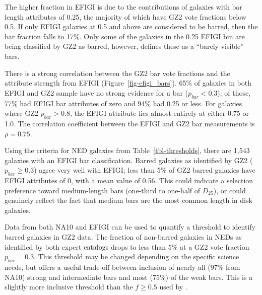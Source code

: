 \documentclass[useAMS,usenatbib]{mn2e}
\providecommand{\DIFaddtex}[1]{{\protect\color{blue}\uwave{#1}}} %
\providecommand{\DIFdeltex}[1]{{\protect\color{red}\sout{#1}}}                      %
\providecommand{\DIFaddbegin}{} %
\providecommand{\DIFaddend}{} %
\providecommand{\DIFdelbegin}{} %
\providecommand{\DIFdelend}{} %
\providecommand{\DIFadd}[1]{\texorpdfstring{\DIFaddtex{#1}}{#1}} %
\providecommand{\DIFdel}[1]{\texorpdfstring{\DIFdeltex{#1}}{}} %
\begin{document}
The higher fraction in EFIGI is due to the contributions of galaxies with bar length attributes of 0.25, the majority of which have GZ2 vote fractions below 0.5. If only EFIGI galaxies at 0.5 and above are considered to be barred, then the bar fraction falls to 17\%. Only some of the galaxies in the 0.25 EFIGI bin are being classified by GZ2 as barred, however, \citet{bai11} defines these as a ``barely visible'' bars. %

There is a strong correlation between the GZ2 bar vote fractions and the attribute strength from EFIGI (Figure~\ref{fig-efigi_bars}). 65\% of galaxies in both EFIGI and GZ2 sample have no strong evidence for a bar ($p_{bar}<0.3$); of those, 77\% had EFIGI bar attributes of zero and 94\% had 0.25 or less. For galaxies where GZ2 $p_{bar}>0.8$, the EFIGI attribute lies almost entirely at either 0.75 or 1.0. The correlation coefficient between the EFIGI and GZ2 bar measurements is $\rho=0.75$. 

Using the criteria for NED galaxies from Table~\ref{tbl-thresholds}, there are 1,543 galaxies with an EFIGI bar classification. Barred galaxies as identified by GZ2 ($p_{bar}\geq0.3$) agree very well with EFIGI; less than 5\% of GZ2 barred galaxies have EFIGI attributes of 0, with a mean value of 0.56. This could indicate a selection preference toward medium-length bars (one-third to one-half of $D_{25}$), or could genuinely reflect the fact that medium bars are the most common length in disk galaxies. 

Data from both NA10 and EFIGI can be used to quantify a threshold to identify barred galaxies in GZ2 data. The fraction of non-barred galaxies in NEDs as identified by both expert \DIFdelbegin \DIFdel{catalogs }\DIFdelend \DIFaddbegin \DIFadd{catalogues }\DIFaddend drops to less than $5\%$ at a GZ2 vote fraction $p_{bar}=0.3$. This threshold may be changed depending on the specific science needs, but offers a useful trade-off between inclusion of nearly all (97\% from NA10) strong and intermediate bars and most (75\%) of the weak bars. This is a slightly more inclusive threshold than the $f\geq0.5$ used by \citet{mas11c}.


\end{document}

